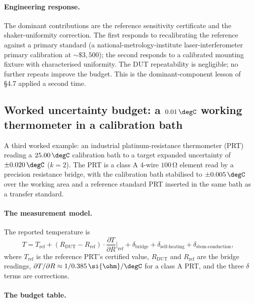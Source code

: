 \paragraph{Engineering response.} The dominant contributions are
the reference sensitivity certificate and the shaker-uniformity
correction. The first responds to recalibrating the reference
against a primary standard (a national-metrology-institute
laser-interferometer primary calibration at $\sim \$3{,}500$);
the second responds to a calibrated mounting fixture with
characterised uniformity. The DUT repeatability is negligible;
no further repeats improve the budget. This is the
dominant-component lesson of \S 4.7 applied a second time.

\subsection{Worked uncertainty budget: a $0.01\,\degC$ working
thermometer in a calibration bath}

A third worked example: an industrial platinum-resistance
thermometer (PRT) reading a $25.00\,\degC$ calibration bath
to a target expanded uncertainty of $\pm 0.020\,\degC$ ($k =
2$). The PRT is a class A 4-wire $100\,\si{\ohm}$ element read
by a precision resistance bridge, with the calibration bath
stabilised to $\pm 0.005\,\degC$ over the working area and a
reference standard PRT inserted in the same bath as a transfer
standard.

\paragraph{The measurement model.} The reported temperature is
\[
T = T_{\text{ref}} + (R_{\text{DUT}} - R_{\text{ref}})
\cdot \frac{\partial T}{\partial R}\bigg|_{\text{ref}}
+ \delta_{\text{bridge}} + \delta_{\text{self-heating}}
+ \delta_{\text{stem-conduction}},
\]
where $T_{\text{ref}}$ is the reference PRT's certified value,
$R_{\text{DUT}}$ and $R_{\text{ref}}$ are the bridge readings,
$\partial T/\partial R \approx 1/0.385\,\si{\ohm}/\degC$ for a
class A PRT, and the three $\delta$ terms are corrections.

\paragraph{The budget table.}


